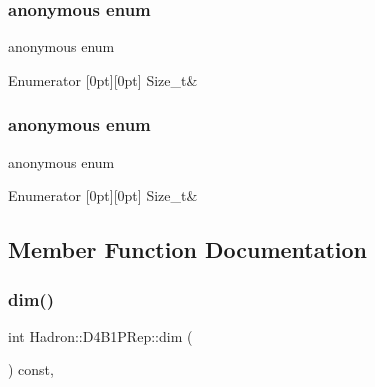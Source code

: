 \subsubsection{\texorpdfstring{anonymous enum}{anonymous enum}}
{\footnotesize\ttfamily anonymous enum}

\begin{DoxyEnumFields}{Enumerator}
[0pt][0pt]{}\mbox{\label{structHadron_1_1D4B1PRep_acafa8d0514697ffd71ada841aff3cb3ea604afccb8b528ebb2c52b9db177a4cbc}} 
Size\+\_\+t&\\
\hline

\end{DoxyEnumFields}
\mbox{\label{structHadron_1_1D4B1PRep_acafa8d0514697ffd71ada841aff3cb3e}} 
\subsubsection{\texorpdfstring{anonymous enum}{anonymous enum}}
{\footnotesize\ttfamily anonymous enum}

\begin{DoxyEnumFields}{Enumerator}
[0pt][0pt]{}\mbox{\label{structHadron_1_1D4B1PRep_acafa8d0514697ffd71ada841aff3cb3ea604afccb8b528ebb2c52b9db177a4cbc}} 
Size\+\_\+t&\\
\hline

\end{DoxyEnumFields}


\subsection{Member Function Documentation}
\mbox{\label{structHadron_1_1D4B1PRep_aec9a69d79952beffdb9f4816ce097f30}} 
\subsubsection{\texorpdfstring{dim()}{dim()}\hspace{0.1cm}{\footnotesize\ttfamily [1/2]}}
{\footnotesize\ttfamily int Hadron\+::\+D4\+B1\+P\+Rep\+::dim (\begin{DoxyParamCaption}{ }\end{DoxyParamCaption}) const\hspace{0.3cm}{\ttfamily [inline]}, {\ttfamily [virtual]}}

